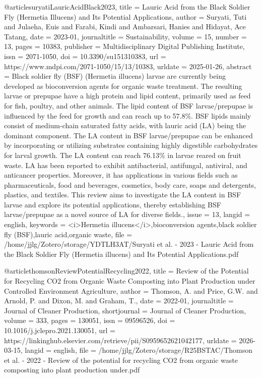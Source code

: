 {{{{@article{suryatiLauricAcidBlack2023,
  title = {Lauric {{Acid}} from the {{Black Soldier Fly}} ({{Hermetia}} Illucens) and {{Its Potential Applications}}},
  author = {Suryati, Tuti and Julaeha, Euis and Farabi, Kindi and Ambarsari, Hanies and Hidayat, Ace Tatang},
  date = {2023-01},
  journaltitle = {Sustainability},
  volume = {15},
  number = {13},
  pages = {10383},
  publisher = {Multidisciplinary Digital Publishing Institute},
  issn = {2071-1050},
  doi = {10.3390/su151310383},
  url = {https://www.mdpi.com/2071-1050/15/13/10383},
  urldate = {2025-01-26},
  abstract = {Black soldier fly (BSF) (Hermetia illucens) larvae are currently being developed as bioconversion agents for organic waste treatment. The resulting larvae or prepupae have a high protein and lipid content, primarily used as feed for fish, poultry, and other animals. The lipid content of BSF larvae/prepupae is influenced by the feed for growth and can reach up to 57.8\%. BSF lipids mainly consist of medium-chain saturated fatty acids, with lauric acid (LA) being the dominant component. The LA content in BSF larvae/prepupae can be enhanced by incorporating or utilizing substrates containing highly digestible carbohydrates for larval growth. The LA content can reach 76.13\% in larvae reared on fruit waste. LA has been reported to exhibit antibacterial, antifungal, antiviral, and anticancer properties. Moreover, it has applications in various fields such as pharmaceuticals, food and beverages, cosmetics, body care, soaps and detergents, plastics, and textiles. This review aims to investigate the LA content in BSF larvae and explore its potential applications, thereby establishing BSF larvae/prepupae as a novel source of LA for diverse fields.},
  issue = {13},
  langid = {english},
  keywords = {<i>Hermetia illucens</i>,bioconversion agents,black soldier fly (BSF),lauric acid,organic waste},
  file = {/home/jjlg/Zotero/storage/YDTLH3AT/Suryati et al. - 2023 - Lauric Acid from the Black Soldier Fly (Hermetia illucens) and Its Potential Applications.pdf}
}

@article{thomsonReviewPotentialRecycling2022,
  title = {Review of the Potential for Recycling {{CO2}} from Organic Waste Composting into Plant Production under Controlled Environment Agriculture},
  author = {Thomson, A. and Price, G.W. and Arnold, P. and Dixon, M. and Graham, T.},
  date = {2022-01},
  journaltitle = {Journal of Cleaner Production},
  shortjournal = {Journal of Cleaner Production},
  volume = {333},
  pages = {130051},
  issn = {09596526},
  doi = {10.1016/j.jclepro.2021.130051},
  url = {https://linkinghub.elsevier.com/retrieve/pii/S0959652621042177},
  urldate = {2026-03-15},
  langid = {english},
  file = {/home/jjlg/Zotero/storage/R25BSTAC/Thomson et al. - 2022 - Review of the potential for recycling CO2 from organic waste composting into plant production under.pdf}
}

}}}}
